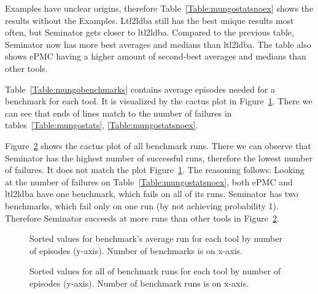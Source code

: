 \documentclass[
	digital,
nolof, nolot
]{fithesis3}
\begin{document}
	Examples have unclear origins, therefore Table~\ref{Table:mungostatsnoex} shows the results without the Examples. Ltl2ldba still has the best unique results most often, but Seminator gets closer to ltl2ldba. Compared to the previous table, Seminator now has more best averages and medians than ltl2ldba. The table also shows ePMC having a higher amount of second-best averages and medians than other tools. 
	
	Table~\ref{Table:mungobenchmarks} contains average episodes needed for a benchmark for each tool. It is visualized by the cactus plot in Figure~\ref{Cactus:mungoaverage}. There we can see that ends of lines match to the number of failures in tables~\ref{Table:mungostats}, \ref{Table:mungostatsnoex}.
	
	Figure~\ref{Cactus:mungoruns} shows the cactus plot of all benchmark runs. There we can observe that Seminator has the highest number of successful runs, therefore the lowest number of failures. It does not match the plot Figure~\ref{Cactus:mungoaverage}. The reasoning follows: Looking at the number of failures on Table~\ref{Table:mungostatsnoex}, both ePMC and ltl2ldba have one benchmark, which fails on all of its runs. Seminator has two benchmarks, which fail only on one run (by not achieving probability 1). Therefore Seminator succeeds at more runs than other tools in Figure~\ref{Cactus:mungoruns}.
	
	
	
	\begin{table}[ht]
		\centering
		
		\caption{Results with Examples included}
		\label{Table:mungostats}
		
	\end{table}
	
	\begin{table}[ht]
		\centering
		
		\caption{Results with Examples excluded }
		\label{Table:mungostatsnoex}
		
	\end{table}
	
	\begin{table}[ht]
		\centering
		
		\caption{Table of average episodes needed to reach probability 1.}
		\label{Table:mungobenchmarks}
		
	\end{table}
	
	\begin{figure}[ht]
		\centering
		
		\caption{Sorted values for benchmark's average run for each tool by number of episodes (y-axis). Number of benchmarks is on x-axis. }
		\label{Cactus:mungoaverage}
		
	\end{figure}
	\begin{figure}
		\centering
		
		\caption{Sorted values for all of benchmark runs for each tool by number of episodes (y-axis). Number of benchmark runs is on x-axis. }
		\label{Cactus:mungoruns}
	
	\end{figure}
	
\end{document}
